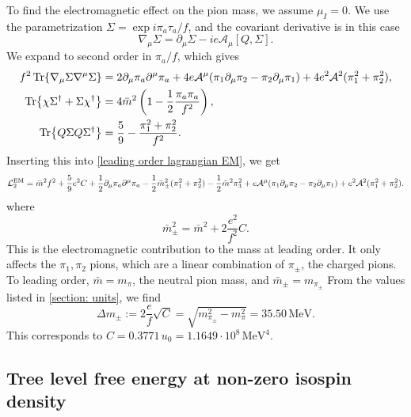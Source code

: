 To find the electromagnetic effect on the pion mass, we assume $\mu_I = 0$.
We use the parametrization $\Sigma = \exp{i \pi_a \tau_a / f}$, and the covariant derivative is in this case
%
\begin{equation}
    \nabla_\mu \Sigma = \partial_\mu \Sigma - i e \mathcal A_\mu [Q, \Sigma].
\end{equation}
%
We expand to second order in $\pi_a/f$, which gives
%
\begin{align}
    f^2 \Tr{\nabla_\mu \Sigma \nabla^\mu \Sigma}
    &=
    2\partial_\mu \pi_a\partial^\mu \pi_a
    + 4 e \mathcal A^\mu (\pi_1 \partial_\mu \pi_2 -\pi_2 \partial_\mu \pi_1)
    + 4 e^2 \mathcal A^2 (\pi_1^2 + \pi_2^2), \\
    \Tr{\chi \Sigma^\dagger + \Sigma \chi^\dagger}
    & = 4 \bar m^2\left(1 - \frac{1}{2} \frac{\pi_a \pi_a}{f^2}\right), \\
    \Tr{Q \Sigma Q \Sigma^\dagger}
    & = \frac{5}{9} - \frac{\pi_1^2 + \pi_2^2}{f^2}.
\end{align}
%
Inserting this into \autoref{leading order lagrangian EM}, we get
%
\begin{equation}
    \mathcal{L}_2^\text{EM}
    = \bar m^2 f^2 + \frac{5}{9}e^2 C
    + \frac{1}{2}\partial_\mu \pi_a \partial^\mu \pi_a
    - \frac{1}{2} \bar m_\pm^2 (\pi_1^2 + \pi_2^2) 
    - \frac{1}{2}\bar m^2 \pi_3^2
    + e \mathcal A^\mu (\pi_1 \partial_\mu \pi_2 -\pi_2 \partial_\mu \pi_1)
    + e^2 \mathcal A^2 (\pi_1^2 + \pi_2^2).
\end{equation}
%
where
\begin{equation}
    \bar m_\pm^2 = \bar m^2 + 2\frac{e^2}{f^2}C.
\end{equation}
%
This is the electromagnetic contribution to the mass at leading order.
It only affects the $\pi_1, \pi_2$ pions, which are a linear combination of $\pi_\pm$, the charged pions.
To leading order, $\bar m = m_\pi$, the neutral pion mass, and $\bar m_{\pm} = m_{\pi_{\pm}}$
From the values listed in \autoref{section: units}, we find
%
\begin{equation}
    \label{EM mass contribtuion leading order}
    \Delta m_{\pm} := 2\frac{e}{f}\sqrt{C} = \sqrt{m_{\pi_\pm}^2 - m_{\pi}^2} = 35.50 \, \text{MeV}.
\end{equation}
%
This corresponds to $C = 0.3771 \, u_0 = 1.1649\cdot 10^8 \, \text{MeV}^4$.


\subsection{Tree level free energy at non-zero isospin density} 

